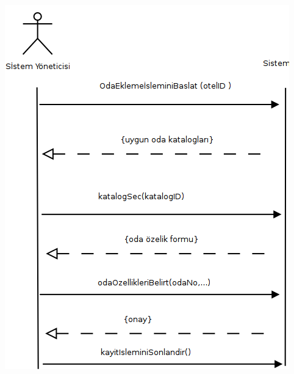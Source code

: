 \documentclass[12pt,a4paper]{report}
\begin{document}
\newpage

\begin{center}
\includegraphics{dia/ssd-usecase3.png}
\end{center}

\newpage
\end{document}
